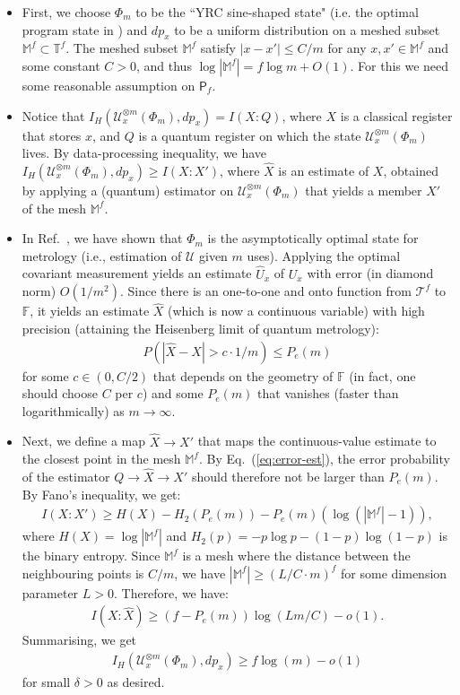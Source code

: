 \documentclass[11pt,letterpaper]{article}
\def\map{\mathcal}
\def\set{\mathsf}
\begin{document}
\begin{itemize}
    \item First, we choose $\Phi_m$ to be the ``YRC sine-shaped state" (i.e. the optimal program state in \cite{yang2020optimal}) and $dp_x$ to be a uniform distribution on a meshed subset $\mathbb{M}^f\subset\mathbb{T}^f$. The meshed subset $\mathbb{M}^f$ satisfy $|x-x'|\le C/m$ for any $x,x'\in \mathbb{M}^f$ and some constant $C>0$, and thus  $\log|\mathbb{M}^f|=f\log m+O(1)$. For this we need some reasonable assumption on $\set{P}_f$.
    \item Notice that $I_H(\map{U}_x^{\otimes m}(\Phi_m),d p_x)=I(X:Q)$, where $X$ is a classical register that stores $x$, and $Q$ is a quantum register on which the state $\map{U}_x^{\otimes m}(\Phi_m)$ lives. By data-processing inequality, we have $I_H(\map{U}_x^{\otimes m}(\Phi_m),d p_x)\ge I(X:X')$, where $\hat{X}$ is an estimate of $X$, obtained by applying a (quantum) estimator on $\map{U}_x^{\otimes m}(\Phi_m)$ that yields a member $X'$ of the mesh $\mathbb{M}^f$.
    \item In Ref.~\cite{yang2020optimal}, we have shown that $\Phi_m$ is the asymptotically optimal state for metrology (i.e., estimation of $\map{U}$ given $m$ uses). Applying the optimal covariant measurement yields an estimate $\hat{U}_x$ of $U_x$ with error (in diamond norm) $O(1/m^2)$. Since there is an one-to-one and onto function from $\mathcal{T}^f$ to $\mathbb{F}$, it yields an estimate $\hat{X}$ (which is now a continuous variable) with high precision (attaining the  Heisenberg limit of quantum metrology):
    \begin{align}\label{eq:error-est}
        P(|\hat{X}-X|>c\cdot 1/m)\le P_e(m)
    \end{align}
    for some $c\in(0,C/2)$ that depends on the geometry of $\mathbb{F}$ (in fact, one should choose $C$ per $c$) and some $P_e(m)$ that vanishes (faster than logarithmically) as $m\to\infty$.
    \item Next, we define a map $\hat{X}\to X'$ that maps the continuous-value estimate to the closest point in the mesh $\mathbb{M}^f$. By Eq.~(\ref{eq:error-est}), the error probability of the estimator $Q\to \hat{X}\to X'$ should therefore not be larger than $P_e(m)$. By Fano's inequality, we get:
    \begin{align}
        I(X:X')\ge H(X)-H_2(P_e(m))-P_e(m)(\log(|\mathbb{M}^f|-1)),
    \end{align}
    where $H(X)=\log|\mathbb{M}^f|$ and $H_2(p)=-p\log p -(1-p)\log(1-p)$ is the binary entropy. Since $\mathbb{M}^f$ is a mesh where the distance between the neighbouring points is $C/m$, we have $|\mathbb{M}^f|\ge (L/C\cdot m)^f$ for some dimension parameter $L>0$. Therefore, we have:
     \begin{align}
        I(X:\hat{X})\ge (f-P_e(m))\log(Lm/C)-o(1).
    \end{align}
    Summarising, we get 
    \begin{align}
        I_H(\map{U}_x^{\otimes m}(\Phi_m),d p_x)\ge f\log(m)-o(1)
    \end{align}
    for small $\delta>0$ as desired.
\end{itemize}
\end{document}
